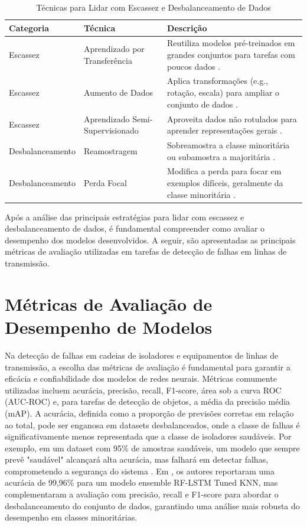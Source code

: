 \begin{table}[H]
\centering
\caption{Técnicas para Lidar com Escassez e Desbalanceamento de Dados}
\label{tab:tecnicas_escassez_desbalanceamento_datasets}
\begin{tabular}{|p{3.5cm}|p{3.5cm}|p{7.5cm}|}
\hline
\textbf{Categoria} & \textbf{Técnica} & \textbf{Descrição} \\
\hline
Escassez & Aprendizado por Transferência & Reutiliza modelos pré-treinados em grandes conjuntos para tarefas com poucos dados \cite{pan2010survey}. \\
\hline
Escassez & Aumento de Dados & Aplica transformações (e.g., rotação, escala) para ampliar o conjunto de dados \cite{shorten2019survey}. \\
\hline
Escassez & Aprendizado Semi-Supervisionado & Aproveita dados não rotulados para aprender representações gerais \cite{van2020survey}. \\
\hline
Desbalanceamento & Reamostragem & Sobreamostra a classe minoritária ou subamostra a majoritária \cite{johnson2019survey}. \\
\hline
Desbalanceamento & Perda Focal & Modifica a perda para focar em exemplos difíceis, geralmente da classe minoritária \cite{lin2017focal}. \\
\hline
\end{tabular}
\end{table}

Após a análise das principais estratégias para lidar com escassez e desbalanceamento de dados, é fundamental compreender como avaliar o desempenho dos modelos desenvolvidos. A seguir, são apresentadas as principais métricas de avaliação utilizadas em tarefas de detecção de falhas em linhas de transmissão.

\section{Métricas de Avaliação de Desempenho de Modelos}

Na detecção de falhas em cadeias de isoladores e equipamentos de linhas de transmissão, a escolha das métricas de avaliação é fundamental para garantir a eficácia e confiabilidade dos modelos de redes neurais. Métricas comumente utilizadas incluem acurácia, precisão, recall, F1-score, área sob a curva ROC (AUC-ROC) e, para tarefas de detecção de objetos, a média da precisão média (mAP). A acurácia, definida como a proporção de previsões corretas em relação ao total, pode ser enganosa em datasets desbalanceados, onde a classe de falhas é significativamente menos representada que a classe de isoladores saudáveis. Por exemplo, em um dataset com 95\% de amostras saudáveis, um modelo que sempre prevê "saudável" alcançará alta acurácia, mas falhará em detectar falhas, comprometendo a segurança do sistema \cite{he2009learning}. Em , os autores reportaram uma acurácia de 99,96\% para um modelo ensemble RF-LSTM Tuned KNN, mas complementaram a avaliação com precisão, recall e F1-score para abordar o desbalanceamento do conjunto de dados, garantindo uma análise mais robusta do desempenho em classes minoritárias.

